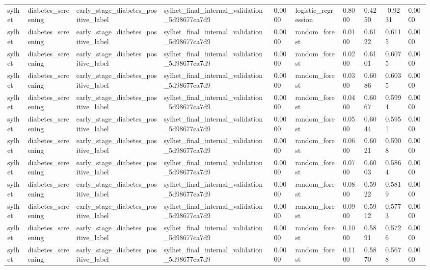 \begin{tabular}{llllllllll}
sylhet & diabetes\_screening & early\_stage\_diabetes\_positive\_label & sylhet\_final\_internal\_validation\_5d98677ca7d9 & 0.0000 & logistic\_regression & 0.8000 & 0.4250 & -0.9231 & 0.0000 \\
sylhet & diabetes\_screening & early\_stage\_diabetes\_positive\_label & sylhet\_final\_internal\_validation\_5d98677ca7d9 & 0.0000 & random\_forest & 0.0100 & 0.6122 & 0.6115 & 0.0000 \\
sylhet & diabetes\_screening & early\_stage\_diabetes\_positive\_label & sylhet\_final\_internal\_validation\_5d98677ca7d9 & 0.0000 & random\_forest & 0.0200 & 0.6101 & 0.6075 & 0.0000 \\
sylhet & diabetes\_screening & early\_stage\_diabetes\_positive\_label & sylhet\_final\_internal\_validation\_5d98677ca7d9 & 0.0000 & random\_forest & 0.0300 & 0.6086 & 0.6035 & 0.0000 \\
sylhet & diabetes\_screening & early\_stage\_diabetes\_positive\_label & sylhet\_final\_internal\_validation\_5d98677ca7d9 & 0.0000 & random\_forest & 0.0400 & 0.6067 & 0.5994 & 0.0000 \\
sylhet & diabetes\_screening & early\_stage\_diabetes\_positive\_label & sylhet\_final\_internal\_validation\_5d98677ca7d9 & 0.0000 & random\_forest & 0.0500 & 0.6044 & 0.5951 & 0.0000 \\
sylhet & diabetes\_screening & early\_stage\_diabetes\_positive\_label & sylhet\_final\_internal\_validation\_5d98677ca7d9 & 0.0000 & random\_forest & 0.0600 & 0.6021 & 0.5908 & 0.0000 \\
sylhet & diabetes\_screening & early\_stage\_diabetes\_positive\_label & sylhet\_final\_internal\_validation\_5d98677ca7d9 & 0.0000 & random\_forest & 0.0700 & 0.6003 & 0.5864 & 0.0000 \\
sylhet & diabetes\_screening & early\_stage\_diabetes\_positive\_label & sylhet\_final\_internal\_validation\_5d98677ca7d9 & 0.0000 & random\_forest & 0.0800 & 0.5922 & 0.5819 & 0.0000 \\
sylhet & diabetes\_screening & early\_stage\_diabetes\_positive\_label & sylhet\_final\_internal\_validation\_5d98677ca7d9 & 0.0000 & random\_forest & 0.0900 & 0.5912 & 0.5773 & 0.0000 \\
sylhet & diabetes\_screening & early\_stage\_diabetes\_positive\_label & sylhet\_final\_internal\_validation\_5d98677ca7d9 & 0.0000 & random\_forest & 0.1000 & 0.5891 & 0.5726 & 0.0000 \\
sylhet & diabetes\_screening & early\_stage\_diabetes\_positive\_label & sylhet\_final\_internal\_validation\_5d98677ca7d9 & 0.0000 & random\_forest & 0.1100 & 0.5870 & 0.5678 & 0.0000 \\

\end{tabular}
